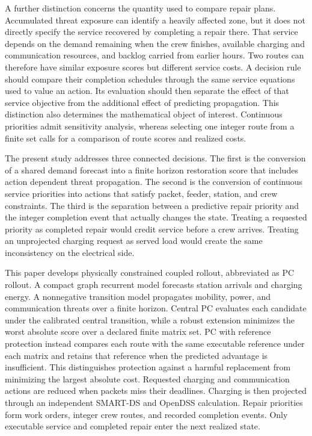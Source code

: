\documentclass[journal]{IEEEtran}
\begin{document}
A further distinction concerns the quantity used to compare repair plans.
Accumulated threat exposure can identify a heavily affected zone, but it does
not directly specify the service recovered by completing a repair there.  That
service depends on the demand remaining when the crew finishes, available
charging and communication resources, and backlog carried from earlier hours.
Two routes can therefore have similar exposure scores but different service
costs.  A decision rule should compare their completion schedules through the
same service equations used to value an action.  Its evaluation should then
separate the effect of that service objective from the additional effect of
predicting propagation.  This distinction also determines the mathematical
object of interest.  Continuous priorities admit sensitivity analysis, whereas
selecting one integer route from a finite set calls for a comparison of route
scores and realized costs.

The present study addresses three connected decisions.  The first is the
conversion of a shared demand forecast into a finite horizon restoration score
that includes action dependent threat propagation.  The second is the
conversion of continuous service priorities into actions that satisfy packet,
feeder, station, and crew constraints.  The third is the separation between a
predictive repair priority and the integer completion event that actually
changes the state.  Treating a requested priority as completed repair would
credit service before a crew arrives.  Treating an unprojected charging request
as served load would create the same inconsistency on the electrical side.

This paper develops physically constrained coupled rollout, abbreviated as PC
rollout.  A compact graph recurrent model forecasts station arrivals and
charging energy.  A nonnegative transition model propagates mobility, power,
and communication threats over a finite horizon.  Central PC evaluates each
candidate under the calibrated central transition, while a robust extension
minimizes the worst absolute score over a declared finite matrix set.
PC with reference protection instead compares each route with the same
executable reference under each matrix and retains that reference when the
predicted advantage is insufficient.  This distinguishes protection against
a harmful replacement from minimizing the largest absolute cost.
Requested charging and communication actions are reduced when
packets miss their deadlines.  Charging is then projected through an
independent SMART-DS and OpenDSS calculation.  Repair priorities form work
orders, integer crew routes, and recorded completion events.  Only executable
service and completed repair enter the next realized state.
\end{document}
